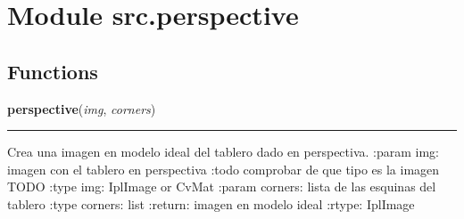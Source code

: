 %
%
%


\section{Module src.perspective}

    \label{src:perspective}


  \subsection{Functions}

    \label{src:perspective:perspective}

    \vspace{0.5ex}

\hspace{.8\funcindent}\begin{boxedminipage}{\funcwidth}

    \raggedright \textbf{perspective}(\textit{img}, \textit{corners})

    \vspace{-1.5ex}

    \rule{\textwidth}{0.5\fboxrule}
\setlength{\parskip}{2ex}
    Crea una imagen en modelo ideal del tablero dado en perspectiva. :param
    img: imagen con el tablero en perspectiva :todo comprobar de que tipo 
    es la imagen TODO :type img: IplImage or CvMat :param corners: lista de
    las esquinas del tablero :type corners: list :return: imagen en modelo 
    ideal :rtype: IplImage

\setlength{\parskip}{1ex}
    \end{boxedminipage}



